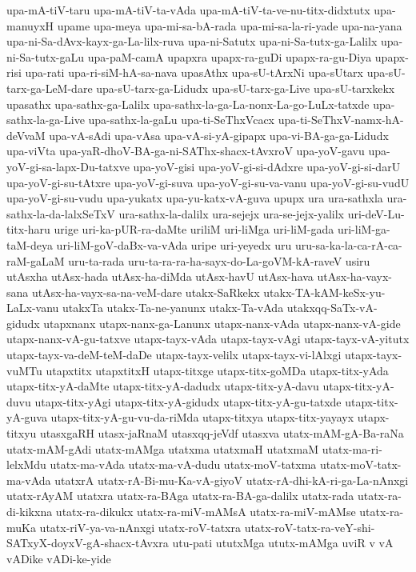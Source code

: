 {upa-mA-tiV-taru
upa-mA-tiV-ta-vAda
upa-mA-tiV-ta-ve-nu-titx-didxtutx
upa-manuyxH
upame
upa-meya
upa-mi-sa-bA-rada
upa-mi-sa-la-ri-yade
upa-na-yana
upa-ni-Sa-dAvx-kayx-ga-La-lilx-ruva
upa-ni-Satutx
upa-ni-Sa-tutx-ga-Lalilx
upa-ni-Sa-tutx-gaLu
upa-paM-camA
upapxra
upapx-ra-guDi
upapx-ra-gu-Diya
upapx-risi
upa-rati
upa-ri-siM-hA-sa-nava
upasAthx
upa-sU-tArxNi
upa-sUtarx
upa-sU-tarx-ga-LeM-dare
upa-sU-tarx-ga-Lidudx
upa-sU-tarx-ga-Live
upa-sU-tarxkekx
upasathx
upa-sathx-ga-Lalilx
upa-sathx-la-ga-La-nonx-La-go-LuLx-tatxde
upa-sathx-la-ga-Live
upa-sathx-la-gaLu
upa-ti-SeThxVcacx
upa-ti-SeThxV-namx-hA-deVvaM
upa-vA-sAdi
upa-vAsa
upa-vA-si-yA-gipapx
upa-vi-BA-ga-ga-Lidudx
upa-viVta
upa-yaR-dhoV-BA-ga-ni-SAThx-shacx-tAvxroV
upa-yoV-gavu
upa-yoV-gi-sa-lapx-Du-tatxve
upa-yoV-gisi
upa-yoV-gi-si-dAdxre
upa-yoV-gi-si-darU
upa-yoV-gi-su-tAtxre
upa-yoV-gi-suva
upa-yoV-gi-su-va-vanu
upa-yoV-gi-su-vudU
upa-yoV-gi-su-vudu
upa-yukatx
upa-yu-katx-vA-guva
upupx
ura
ura-sathxla
ura-sathx-la-da-lalxSeTxV
ura-sathx-la-dalilx
ura-sejejx
ura-se-jejx-yalilx
uri-deV-Lu-titx-haru
urige
uri-ka-pUR-ra-daMte
uriliM
uri-liMga
uri-liM-gada
uri-liM-ga-taM-deya
uri-liM-goV-daBx-va-vAda
uripe
uri-yeyedx
uru
uru-sa-ka-la-ca-rA-ca-raM-gaLaM
uru-ta-rada
uru-ta-ra-ra-ha-sayx-do-La-goVM-kA-raveV
usiru
utAsxha
utAsx-hada
utAsx-ha-diMda
utAsx-havU
utAsx-hava
utAsx-ha-vayx-sana
utAsx-ha-vayx-sa-na-veM-dare
utakx-SaRkekx
utakx-TA-kAM-keSx-yu-LaLx-vanu
utakxTa
utakx-Ta-ne-yanunx
utakx-Ta-vAda
utakxqq-SaTx-vA-gidudx
utapxnanx
utapx-nanx-ga-Lanunx
utapx-nanx-vAda
utapx-nanx-vA-gide
utapx-nanx-vA-gu-tatxve
utapx-tayx-vAda
utapx-tayx-vAgi
utapx-tayx-vA-yitutx
utapx-tayx-va-deM-teM-daDe
utapx-tayx-velilx
utapx-tayx-vi-lAlxgi
utapx-tayx-vuMTu
utapxtitx
utapxtitxH
utapx-titxge
utapx-titx-goMDa
utapx-titx-yAda
utapx-titx-yA-daMte
utapx-titx-yA-dadudx
utapx-titx-yA-davu
utapx-titx-yA-duvu
utapx-titx-yAgi
utapx-titx-yA-gidudx
utapx-titx-yA-gu-tatxde
utapx-titx-yA-guva
utapx-titx-yA-gu-vu-da-riMda
utapx-titxya
utapx-titx-yayayx
utapx-titxyu
utasxgaRH
utasx-jaRnaM
utasxqq-jeVdf
utasxva
utatx-mAM-gA-Ba-raNa
utatx-mAM-gAdi
utatx-mAMga
utatxma
utatxmaH
utatxmaM
utatx-ma-ri-lelxMdu
utatx-ma-vAda
utatx-ma-vA-dudu
utatx-moV-tatxma
utatx-moV-tatx-ma-vAda
utatxrA
utatx-rA-Bi-mu-Ka-vA-giyoV
utatx-rA-dhi-kA-ri-ga-La-nAnxgi
utatx-rAyAM
utatxra
utatx-ra-BAga
utatx-ra-BA-ga-dalilx
utatx-rada
utatx-ra-di-kikxna
utatx-ra-dikukx
utatx-ra-miV-mAMsA
utatx-ra-miV-mAMse
utatx-ra-muKa
utatx-riV-ya-va-nAnxgi
utatx-roV-tatxra
utatx-roV-tatx-ra-veY-shi-SATxyX-doyxV-gA-shacx-tAvxra
utu-pati
ututxMga
ututx-mAMga
uviR
v
vA
vADike
vADi-ke-yide
}
